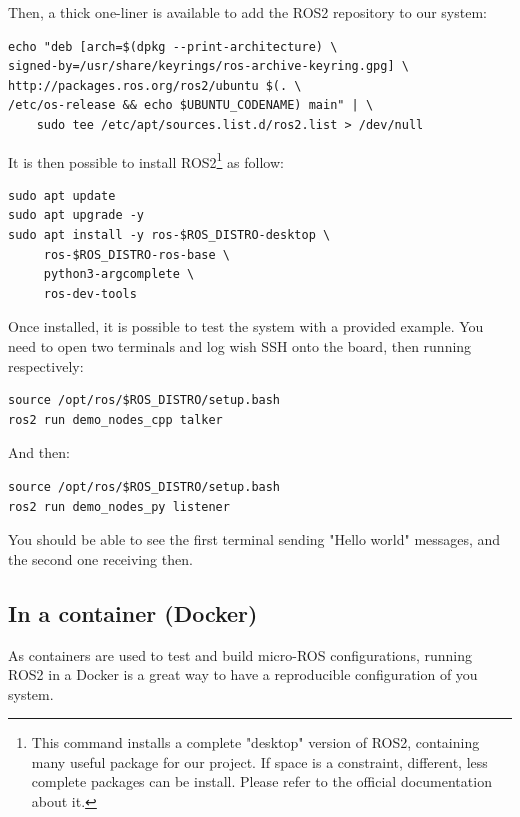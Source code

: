 \documentclass[10pt]{article}
\begin{document}
Then, a thick one-liner is available to add the ROS2 repository to our system:
\begin{verbatim}
echo "deb [arch=$(dpkg --print-architecture) \
signed-by=/usr/share/keyrings/ros-archive-keyring.gpg] \
http://packages.ros.org/ros2/ubuntu $(. \
/etc/os-release && echo $UBUNTU_CODENAME) main" | \
    sudo tee /etc/apt/sources.list.d/ros2.list > /dev/null
\end{verbatim}

It is then possible to install ROS2\footnote{This command installs a complete "desktop" version of ROS2, containing many
useful package for our project.
If space is a constraint, different, less complete packages can be install.
Please refer to the official documentation about it.} as follow:
\begin{verbatim}
sudo apt update
sudo apt upgrade -y
sudo apt install -y ros-$ROS_DISTRO-desktop \
     ros-$ROS_DISTRO-ros-base \
     python3-argcomplete \
     ros-dev-tools
\end{verbatim}

Once installed, it is possible to test the system with a provided example.
You need to open two terminals and log wish SSH onto the board, then running
respectively:
\begin{verbatim}
source /opt/ros/$ROS_DISTRO/setup.bash
ros2 run demo_nodes_cpp talker
\end{verbatim}

And then:
\begin{verbatim}
source /opt/ros/$ROS_DISTRO/setup.bash
ros2 run demo_nodes_py listener
\end{verbatim}

You should be able to see the first terminal sending "Hello world" messages,
and the second one receiving then.

\subsection{In a container (Docker)}
\label{sec:org36d1099}
As containers are used to test and build micro-ROS configurations,
running ROS2 in a Docker  is a great way to have a reproducible configuration
of you system.
\end{document}
